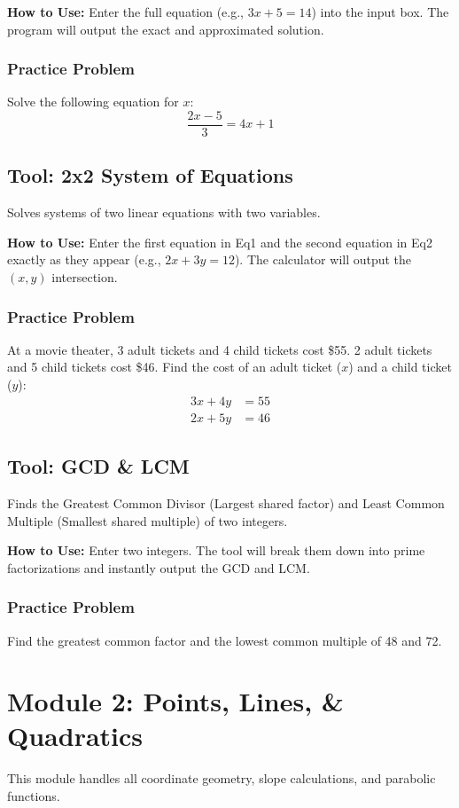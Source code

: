 \documentclass[11pt,a4paper]{article}
\begin{document}
\textbf{How to Use:} Enter the full equation (e.g., $3x+5=14$) into the input box. The program will output the exact and approximated solution.

\subsubsection*{Practice Problem}
Solve the following equation for $x$: 
\[ \frac{2x - 5}{3} = 4x + 1 \]

\subsection{Tool: 2x2 System of Equations}
Solves systems of two linear equations with two variables.

\textbf{How to Use:} Enter the first equation in Eq1 and the second equation in Eq2 exactly as they appear (e.g., $2x+3y=12$). The calculator will output the $(x, y)$ intersection.

\subsubsection*{Practice Problem}
At a movie theater, 3 adult tickets and 4 child tickets cost \$55. 2 adult tickets and 5 child tickets cost \$46. Find the cost of an adult ticket ($x$) and a child ticket ($y$):
\begin{align*}
3x + 4y &= 55 \\
2x + 5y &= 46
\end{align*}

\subsection{Tool: GCD \& LCM}
Finds the Greatest Common Divisor (Largest shared factor) and Least Common Multiple (Smallest shared multiple) of two integers.

\textbf{How to Use:} Enter two integers. The tool will break them down into prime factorizations and instantly output the GCD and LCM.

\subsubsection*{Practice Problem}
Find the greatest common factor and the lowest common multiple of 48 and 72.

\newpage
\section{Module 2: Points, Lines, \& Quadratics}
This module handles all coordinate geometry, slope calculations, and parabolic functions.
\end{document}
